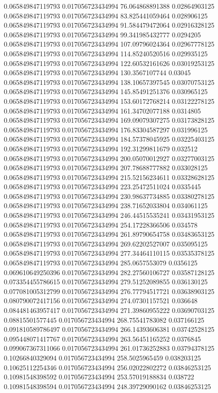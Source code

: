 0.065849847119793 0.017056723434994 76.064868891388 0.02864903125
0.065849847119793 0.017056723434994 83.825441059464 0.028906125
0.065849847119793 0.017056723434994 91.584479472064 0.02916328125
0.065849847119793 0.017056723434994 99.341985432777 0.0294205
0.065849847119793 0.017056723434994 107.09796024364 0.02967778125
0.065849847119793 0.017056723434994 114.85240520516 0.029935125
0.065849847119793 0.017056723434994 122.60532161626 0.03019253125
0.065849847119793 0.017056723434994 130.3567107744 0.03045
0.065849847119793 0.017056723434994 138.10657397545 0.03070753125
0.065849847119793 0.017056723434994 145.85491251376 0.030965125
0.065849847119793 0.017056723434994 153.60172768214 0.03122278125
0.065849847119793 0.017056723434994 161.34702077188 0.0314805
0.065849847119793 0.017056723434994 169.09079307275 0.03173828125
0.065849847119793 0.017056723434994 176.83304587297 0.031996125
0.065849847119793 0.017056723434994 184.57378045925 0.03225403125
0.065849847119793 0.017056723434994 192.31299811679 0.032512
0.065849847119793 0.017056723434994 200.05070012927 0.03277003125
0.065849847119793 0.017056723434994 207.78688777882 0.033028125
0.065849847119793 0.017056723434994 215.52156234611 0.03328628125
0.065849847119793 0.017056723434994 223.25472511024 0.0335445
0.065849847119793 0.017056723434994 230.98637734885 0.03380278125
0.065849847119793 0.017056723434994 238.71652033804 0.034061125
0.065849847119793 0.017056723434994 246.44515535241 0.03431953125
0.065849847119793 0.017056723434994 254.17228366506 0.034578
0.065849847119793 0.017056723434994 261.89790654758 0.03483653125
0.065849847119793 0.017056723434994 269.62202527007 0.035095125
0.065849847119793 0.017056723434994 277.34464110115 0.03535378125
0.065849847119793 0.017056723434994 285.0657553079 0.0356125
0.069610649250396 0.017056723434994 282.27560106727 0.03587128125
0.073354455786615 0.017056723434994 279.51252089855 0.036130125
0.077081005312799 0.017056723434994 276.77794517721 0.03638903125
0.080790072417156 0.017056723434994 274.07301157521 0.036648
0.084481463957417 0.017056723434994 271.39860955222 0.03690703125
0.08815501577445 0.017056723434994 268.75541783082 0.037166125
0.091810589786497 0.017056723434994 266.14393606381 0.03742528125
0.095448071417767 0.017056723434994 263.56451165252 0.0376845
0.099067367311066 0.017056723434994 261.01736252883 0.03794378125
0.10266840329094 0.017056723434994 258.5025965459 0.038203125
0.10625112254346 0.017056723434994 256.02022802272 0.03846253125
0.10981548398592 0.017056723434994 253.57019188834 0.038722
0.10981548398594 0.017056723434994 248.39729090162 0.03846253125
